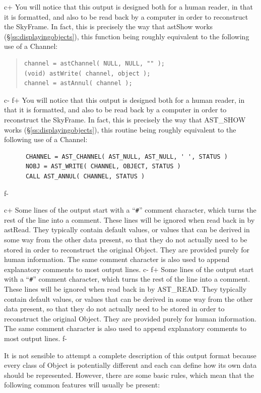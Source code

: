 \documentclass[twoside,11pt]{article}
\newcommand{\secref}[1]{\S\ref{#1}}
\newcommand{\secref}[1]{\ref{#1}}
\begin{document}
c+
You will notice that this output is designed both for a human reader,
in that it is formatted, and also to be read back by a computer in
order to reconstruct the SkyFrame. In fact, this is precisely the way
that astShow works (\secref{ss:displayingobjects}), this function being
roughly equivalent to the following use of a Channel:

\begin{quote}
\small
\begin{verbatim}
channel = astChannel( NULL, NULL, "" );
(void) astWrite( channel, object );
channel = astAnnul( channel );
\end{verbatim}
\normalsize
\end{quote}
c-
f+
You will notice that this output is designed both for a human reader,
in that it is formatted, and also to be read back by a computer in
order to reconstruct the SkyFrame. In fact, this is precisely the way
that AST\_SHOW works (\secref{ss:displayingobjects}), this routine
being roughly equivalent to the following use of a Channel:

\small
\begin{verbatim}
      CHANNEL = AST_CHANNEL( AST_NULL, AST_NULL, ' ', STATUS )
      NOBJ = AST_WRITE( CHANNEL, OBJECT, STATUS )
      CALL AST_ANNUL( CHANNEL, STATUS )
\end{verbatim}
\normalsize
f-

c+
Some lines of the output start with a ``\verb?#?'' comment character,
which turns the rest of the line into a comment. These lines will be
ignored when read back in by astRead.  They typically contain default
values, or values that can be derived in some way from the other data
present, so that they do not actually need to be stored in order to
reconstruct the original Object. They are provided purely for human
information. The same comment character is also used to append
explanatory comments to most output lines.
c-
f+
Some lines of the output start with a ``\verb?#?'' comment character,
which turns the rest of the line into a comment. These lines will be
ignored when read back in by AST\_READ.  They typically contain
default values, or values that can be derived in some way from the
other data present, so that they do not actually need to be stored in
order to reconstruct the original Object. They are provided purely for
human information. The same comment character is also used to append
explanatory comments to most output lines.
f-

It is not sensible to attempt a complete description of this output
format because every class of Object is potentially different and each
can define how its own data should be represented. However, there are
some basic rules, which mean that the following common features will
usually be present:
\end{document}
